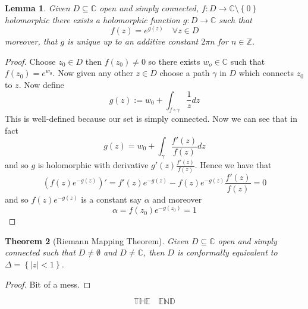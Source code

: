 \documentclass[11pt]{article}
\newcommand{\defeq}{:=}
\newcommand{\abs}[1]{\left|#1\right|}
\newcommand{\C}{\mathbb{C}}
\newcommand{\Z}{\mathbb{Z}}
\newtheorem{theorem}{Theorem}[section]
\newtheorem{lemma}[theorem]{Lemma}
\begin{document}
\begin{lemma}
Given $D\subseteq \C$ open and simply connected, $f:D\to\C\setminus\left\{0\right\}$ holomorphic there exists a holomorphic function $g:D\to \C$ such that
\[
	f(z)=e^{g(z)}\quad\forall z\in D
\]
moreover, that $g$ is unique up to an additive constant $2\pi n$ for $n\in \Z$.
\end{lemma}

\begin{proof}
Choose $z_0\in D$ then $f(z_0)\neq 0$ so there exists $w_o\in\C$ such that $f(z_0)=e^{w_0}$.
Now given any other $z\in D$ choose a path $\gamma$ in $D$ which connects $z_0$ to $z$.
Now define
\[
	g(z)\defeq w_0+\int_{f\circ\gamma}\frac{1}{z}dz
\]
This is well-defined because our set is simply connected.
Now we can see that in fact
\[
	g(z)=w_0+\int_\gamma\frac{f'(z)}{f(z)}dz
\]
and so $g$ is holomorphic with derivative $g'(z)\frac{f'(z)}{f(z)}$.
Hence we have that
\[
	\left(f(z)e^{-g(z)}\right)'=f'(z)e^{-g(z)}-f(z)e^{-g(z)}\frac{f'(z)}{f(z)}=0
\]
and so $f(z)e^{-g(z)}$ is a constant say $\alpha$ and moreover
\[
	\alpha=f(z_0)e^{-g(z_0)}=1
\]
\end{proof}

\begin{theorem}[Riemann Mapping Theorem]
Given $D\subseteq \C$ open and simply connected such that $D\neq\emptyset$ and $D\neq\C$, then $D$ is conformally equivalent to $\Delta=\left\{\abs{z}<1\right\}$.
\end{theorem}
\begin{proof}
Bit of a mess.
\end{proof}

\[
	\mathbb{T}\mathbb{H}\mathbb{E}\quad\mathbb{E}\mathbb{N}\mathbb{D}
\]
\end{document}
